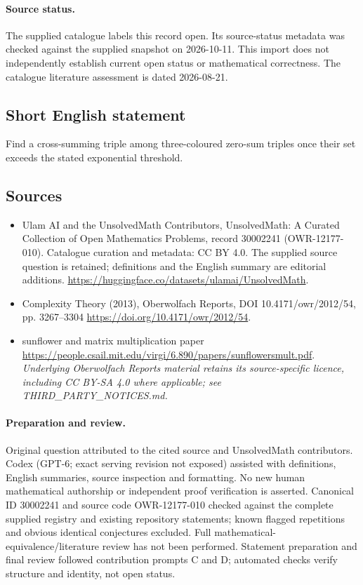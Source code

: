 \documentclass[11pt]{article}
\begin{document}
\paragraph{Source status.}
The supplied catalogue labels this record open. Its source-status metadata was checked against the supplied snapshot on 2026-10-11. This import does not independently establish current open status or mathematical correctness. The catalogue literature assessment is dated 2026-08-21.
\subsection{Short English statement}
Find a cross-summing triple among three-coloured zero-sum triples once their set exceeds the stated exponential threshold.
\subsection{Sources}
\begin{itemize}
\item[S1] Ulam AI and the UnsolvedMath Contributors, UnsolvedMath: A Curated Collection of Open Mathematics Problems, record 30002241 (OWR-12177-010). Catalogue curation and metadata: CC BY 4.0. The supplied source question is retained; definitions and the English summary are editorial additions.
\url{https://huggingface.co/datasets/ulamai/UnsolvedMath}.
\item[S2] Complexity Theory (2013), Oberwolfach Reports, DOI 10.4171/owr/2012/54, pp. 3267--3304
\url{https://doi.org/10.4171/owr/2012/54}.
\item[S3] sunflower and matrix multiplication paper
\url{https://people.csail.mit.edu/virgi/6.890/papers/sunflowersmult.pdf}.
\textit{Underlying Oberwolfach Reports material retains its source-specific licence, including CC BY-SA 4.0 where applicable; see THIRD\_PARTY\_NOTICES.md.}
\end{itemize}
\paragraph{Preparation and review.}
Original question attributed to the cited source and UnsolvedMath contributors. Codex (GPT-6; exact serving revision not exposed) assisted with definitions, English summaries, source inspection and formatting. No new human mathematical authorship or independent proof verification is asserted. Canonical ID 30002241 and source code OWR-12177-010 checked against the complete supplied registry and existing repository statements; known flagged repetitions and obvious identical conjectures excluded. Full mathematical-equivalence/literature review has not been performed. Statement preparation and final review followed contribution prompts C and D; automated checks verify structure and identity, not open status.
\label{end:30002241}
\end{document}
